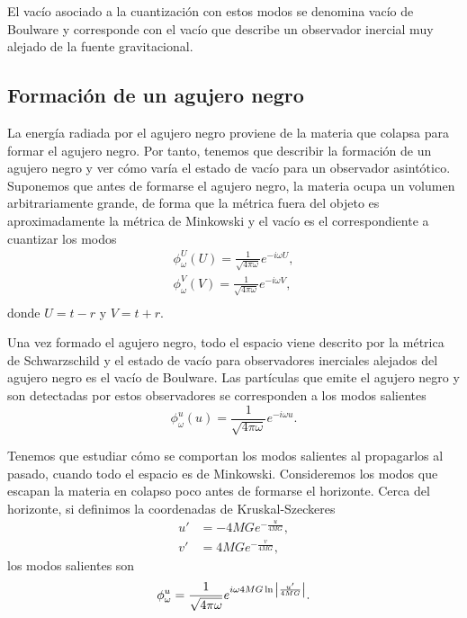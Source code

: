 El vacío asociado a la cuantización con estos modos se denomina vacío de Boulware y 
corresponde con el vacío que describe un observador inercial muy alejado de la fuente
gravitacional.

\subsection{Formación de un agujero negro}

La energía radiada por el agujero negro proviene de la materia que colapsa para formar el agujero negro.
Por tanto, tenemos que describir la formación de un agujero negro y ver cómo varía el estado de vacío
para un observador asintótico.
Suponemos que antes de formarse el agujero negro, la materia ocupa un volumen arbitrariamente grande,
de forma que la métrica fuera del objeto es aproximadamente la métrica de Minkowski y el vacío es el correspondiente
a cuantizar los modos
\begin{equation}
  \begin{gathered}
    \phi_\omega^U (U)=\frac{1}{\sqrt{4\pi\omega}} e^{-i\omega U},\\
    \phi_\omega^V (V)=\frac{1}{\sqrt{4\pi\omega}} e^{-i\omega V},\\
  \end{gathered}
\end{equation}
donde $U=t-r$ y $V=t+r$.

Una vez formado el agujero negro, todo el espacio viene descrito por la métrica de Schwarzschild y
el estado de vacío para observadores inerciales alejados del agujero negro es el vacío de Boulware.
Las partículas que emite el agujero negro y son detectadas por estos observadores se corresponden a los
modos salientes
\begin{equation}
  \phi^u_\omega(u) = \frac{1}{\sqrt{4\pi \omega}}e^{-i\omega u}.
\end{equation}

Tenemos que estudiar cómo se comportan los modos salientes al propagarlos al pasado, cuando todo
el espacio es de Minkowski.
Consideremos los modos que escapan la materia en colapso poco antes de formarse el horizonte.
Cerca del horizonte, si definimos la coordenadas de Kruskal-Szeckeres
\begin{equation}
  \begin{aligned}
    u'&=-4MGe^{-\frac{u}{4MG}},\\
    v'&=4MGe^{-\frac{v}{4MG}},
  \end{aligned}
\end{equation}
los modos salientes son
\begin{equation}
  \phi^{u}_\omega = \frac{1}{\sqrt{4\pi\omega}}e^{i\omega 4MG\ln \abs{\frac{u'}{4MG}}}.
\end{equation}

